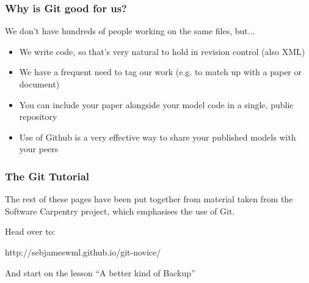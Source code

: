 \documentclass{beamer}
\begin{document}
\begin{frame}
  \frametitle{Why is Git good for us?}
  We don't have hundreds of people working on the same files, but...
  \begin{itemize}
    \pause \item We write code, so that's very natural to hold in
    revision control (also XML)
    \pause \item We have a frequent need to \alert{tag} our work (e.g. to
    match up with a paper or document)
    \pause \item You can include your paper alongside your model code
    in a single, public repository
    \pause \item Use of Github is a very effective way to share your published models with
    your peers

  \end{itemize}
\end{frame}

\begin{frame}
  \frametitle{The Git Tutorial}
  The rest of these pages have been put together from material taken
  from the Software Carpentry project, which emphasises the use of
  Git.

  Head over to:

  http://sebjameswml.github.io/git-novice/

  And start on the lesson ``A better kind of Backup''

\end{frame}
\end{document}
